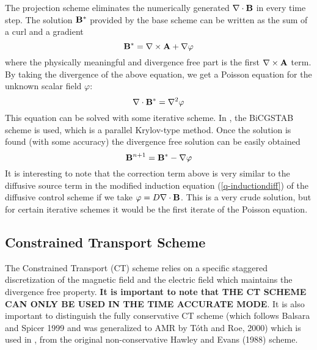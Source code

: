 The projection scheme eliminates the numerically generated $\nabla\cdot\mathbf{B}$ in
every time step. The solution $\mathbf{B}^*$ provided by the base scheme can
be written as the sum of a curl and a gradient
\begin{equation}
  \mathbf{B}^*=\nabla\times\mathbf{A}+\nabla\varphi         \label{q-curlplusgrad}
\end{equation}
where the physically meaningful and divergence free part is the first
$\nabla\times\mathbf{A}$ term. By taking the divergence of the above equation,
we get a Poisson equation for the unknown scalar field $\varphi$:
\begin{equation}
  \nabla\cdot\mathbf{B}^{*}=\nabla^2 \varphi                  \label{q-poisson}
\end{equation}
This equation can be solved with some iterative scheme. In \BATSRUS, the
BiCGSTAB scheme is used, which is a parallel Krylov-type method.
Once the solution is found (with some accuracy) the divergence free solution
can be easily obtained
\begin{equation}
  \mathbf{B}^{n+1}=\mathbf{B}^*-\nabla\varphi                \label{q-correction}
\end{equation}
It is interesting to note that the correction term above is very similar
to the diffusive source term in the modified induction equation 
(\ref{q-inductiondiff}) of the diffusive control scheme if we take 
$\varphi=D \nabla\cdot\mathbf{B}$. This is a very crude solution, but  
for certain iterative schemes it would be the first iterate
of the Poisson equation.

\subsection{Constrained Transport Scheme \label{section:CT}}

The Constrained Transport (CT) scheme relies on a specific staggered 
discretization of the magnetic field and the electric field which maintains 
the divergence free property. {\bf It is important to note that 
THE CT SCHEME CAN ONLY BE USED IN THE TIME ACCURATE MODE}. 
It is also important to distinguish the fully conservative 
CT scheme (which follows Balsara and Spicer 1999 and was generalized to AMR by 
T\'oth and Roe, 2000) which is used in \BATSRUS, 
from the original non-conservative Hawley and Evans (1988) scheme.

